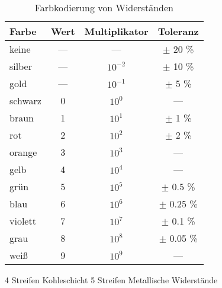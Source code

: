 \begin{table}
    \centering
    \caption{Farbkodierung von Widerständen}
    \label{tab:label}
    \begin{tabular}{l c c c}
        \toprule
        Farbe & Wert & Multiplikator & Toleranz \\
        \midrule
        keine   & ---   & ---       & $\pm$ 20 \% \\
        silber  & ---   & $10^{-2}$ & $\pm$ 10 \% \\
        gold    & ---   & $10^{-1}$ & $\pm$ 5 \% \\
        schwarz & 0     & $10^{0}$  &  --- \\
        braun   & 1     & $10^{1}$  &  $\pm$ 1 \% \\
        rot     & 2     & $10^{2}$  &  $\pm$ 2 \% \\
        orange  & 3     & $10^{3}$  &  --- \\
        gelb    & 4     & $10^{4}$  &  --- \\
        grün    & 5     & $10^{5}$  &  $\pm$ 0.5 \% \\
        blau    & 6     & $10^{6}$  &  $\pm$ 0.25 \% \\
        violett & 7     & $10^{7}$  &  $\pm$ 0.1 \% \\
        grau    & 8     & $10^{8}$  &  $\pm$ 0.05 \% \\
        weiß    & 9     & $10^{9}$  &  --- \\
        \bottomrule
    \end{tabular}
\end{table}

4 Streifen Kohleschicht
5 Streifen Metallische Widerstände
